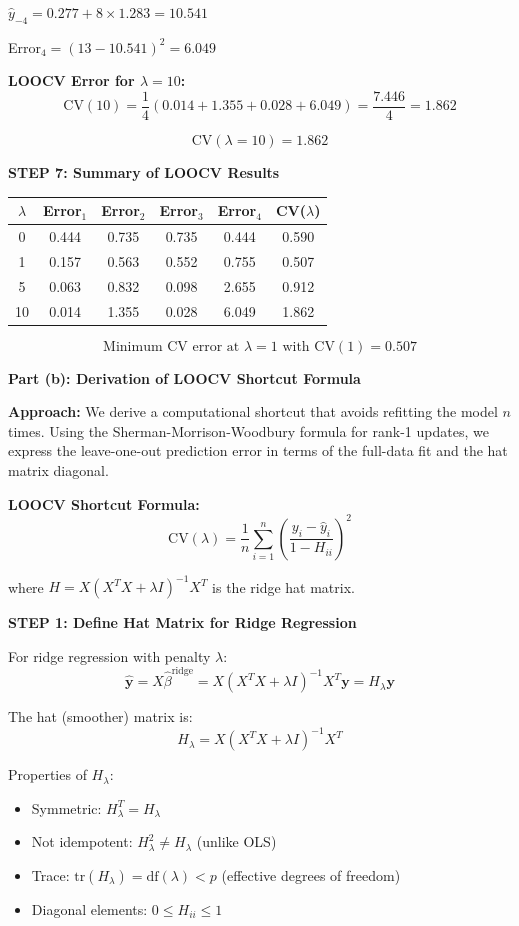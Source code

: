 \documentclass[12pt]{article}
\begin{document}
\begin{solution}
$\hat{y}_{-4} = 0.277 + 8 \times 1.283 = 10.541$

Error$_4 = (13 - 10.541)^2 = 6.049$

\textbf{LOOCV Error for $\lambda = 10$:}
\[\text{CV}(10) = \frac{1}{4}(0.014 + 1.355 + 0.028 + 6.049) = \frac{7.446}{4} = 1.862\]

\[\boxed{\text{CV}(\lambda = 10) = 1.862}\]

\textbf{STEP 7: Summary of LOOCV Results}

\begin{center}
\begin{tabular}{c|cccc|c}
\hline
$\lambda$ & Error$_1$ & Error$_2$ & Error$_3$ & Error$_4$ & CV($\lambda$) \\
\hline
0 & 0.444 & 0.735 & 0.735 & 0.444 & 0.590 \\
1 & 0.157 & 0.563 & 0.552 & 0.755 & 0.507 \\
5 & 0.063 & 0.832 & 0.098 & 2.655 & 0.912 \\
10 & 0.014 & 1.355 & 0.028 & 6.049 & 1.862 \\
\hline
\end{tabular}
\end{center}

\[\boxed{\text{Minimum CV error at } \lambda = 1 \text{ with CV}(1) = 0.507}\]

\textbf{Part (b): Derivation of LOOCV Shortcut Formula}

\textbf{Approach:} We derive a computational shortcut that avoids refitting the model $n$ times. Using the Sherman-Morrison-Woodbury formula for rank-1 updates, we express the leave-one-out prediction error in terms of the full-data fit and the hat matrix diagonal.

\textbf{LOOCV Shortcut Formula:}
\[\text{CV}(\lambda) = \frac{1}{n}\sum_{i=1}^{n}\left(\frac{y_i - \hat{y}_i}{1 - H_{ii}}\right)^2\]

where $H = X(X^TX + \lambda I)^{-1}X^T$ is the ridge hat matrix.

\textbf{STEP 1: Define Hat Matrix for Ridge Regression}

For ridge regression with penalty $\lambda$:
\[\hat{\mathbf{y}} = X\hat{\beta}^{\text{ridge}} = X(X^TX + \lambda I)^{-1}X^T\mathbf{y} = H_\lambda \mathbf{y}\]

The hat (smoother) matrix is:
\[H_\lambda = X(X^TX + \lambda I)^{-1}X^T\]

Properties of $H_\lambda$:
\begin{itemize}
\item Symmetric: $H_\lambda^T = H_\lambda$
\item Not idempotent: $H_\lambda^2 \neq H_\lambda$ (unlike OLS)
\item Trace: $\text{tr}(H_\lambda) = \text{df}(\lambda) < p$ (effective degrees of freedom)
\item Diagonal elements: $0 \leq H_{ii} \leq 1$
\end{itemize}


\end{solution}
\end{document}
